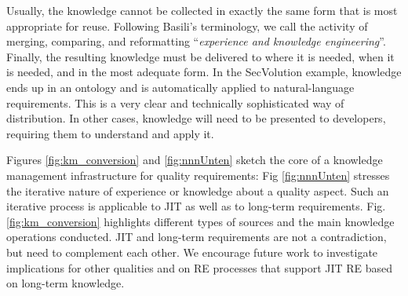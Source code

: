 Usually, the knowledge cannot be collected in exactly the same form that is most appropriate for reuse. Following Basili’s \cite{Basili1994} terminology, we call the activity of merging, comparing, and reformatting ``\emph{experience and knowledge engineering}''. Finally, the resulting knowledge must be delivered to where it is needed, when it is needed, and in the most adequate form. In the SecVolution example, knowledge ends up in an ontology and is automatically applied to natural-language requirements. This is a very clear and technically sophisticated way of distribution. In other cases, knowledge will need to be presented to developers, requiring them to understand and apply it. %

Figures \ref{fig:km_conversion} and \ref{fig:nnnUnten} sketch the core of a knowledge management infrastructure for quality requirements: Fig \ref{fig:nnnUnten}  stresses the iterative nature of experience or knowledge about a quality aspect. 
Such an iterative process is applicable to JIT as well as to long-term requirements. Fig. \ref{fig:km_conversion} highlights different types of sources and the main knowledge operations conducted. %
JIT and long-term requirements are not a contradiction, but need to complement each other.
We encourage future work to investigate implications for other qualities and on RE processes that support JIT RE based on long-term knowledge.
